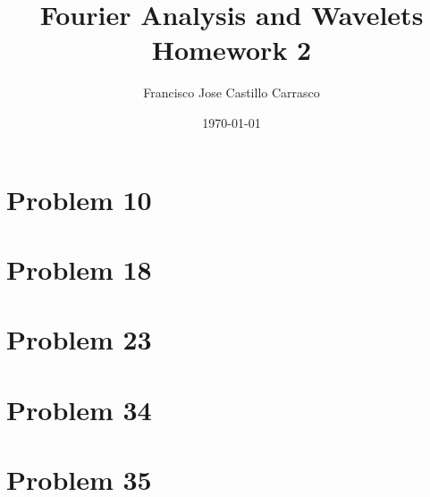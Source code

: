 




\title{Fourier Analysis and Wavelets\\Homework 2}
\author{Francisco Jose Castillo Carrasco}
\date{\today}
\maketitle




\section*{Problem 10}


\section*{Problem 18}


\section*{Problem 23}


\section*{Problem 34}


\section*{Problem 35}



